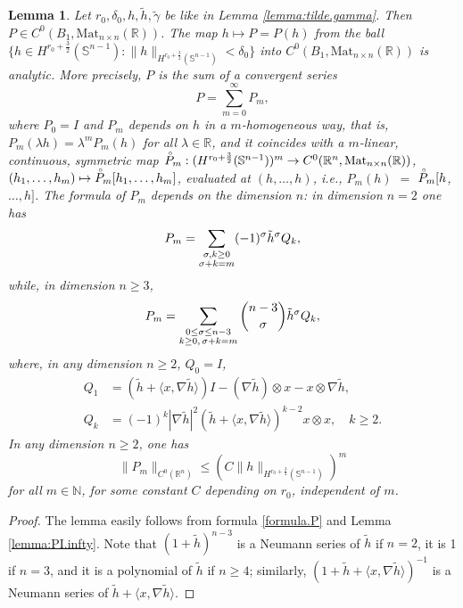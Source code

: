 \documentclass[10pt,reqno,a4paper]{article}
\numberwithin{equation}{section}
\theoremstyle{plain}
\newtheorem{lemma}[theorem]{Lemma}
\theoremstyle{definition}
\newcommand{\N}{{\mathbb N}}
\newcommand{\R}{{\mathbb R}}
\renewcommand{\S}{{\mathbb S}}
\newcommand{\lm}{\lambda}
\newcommand{\la}{\langle}
\newcommand{\ra}{\rangle}
\newcommand{\grad}{\nabla}
\begin{document}
\begin{lemma} \label{lemma:P}
Let $r_0, \delta_0, h, \tilde h, \tilde \gamma$ be like in Lemma \ref{lemma:tilde.gamma}. 
Then $P \in C^0(B_1, \mathrm{Mat}_{n \times n}(\R))$.
The map $h \mapsto P = P(h)$ from the ball 
$\{ h \in H^{r_0+\frac32}(\S^{n-1}) : \| h \|_{H^{r_0+\frac32}(\S^{n-1})} < \delta_0 \}$ 
into $C^0(B_1, \mathrm{Mat}_{n \times n}(\R))$ is analytic.  
More precisely, $P$ is the sum of a convergent series 
\[
P = \sum_{m=0}^\infty P_m,
\]
where $P_0 = I$ and $P_m$ depends on $h$ in a $m$-homogeneous way, 
that is, $P_m(\lm h) = \lm^m P_m(h)$ for all $\lm \in \R$, 
and it coincides with a $m$-linear, continuous, symmetric map  
$\accentset{\circ}{P}_m : ( H^{r_0+\frac32}(\S^{n-1}) )^m \to C^0(\R^n, \mathrm{Mat}_{n \times n}(\R))$, 
$(h_1, \ldots, h_m) \mapsto \accentset{\circ}{P}_m [h_1, \ldots, h_m]$,
evaluated at $(h, \ldots, h)$, i.e., $P_m(h)$ $=$ $\accentset{\circ}{P}_m [h$, $\ldots, h ]$. 
The formula of $P_m$ depends on the dimension $n$: 
in dimension $n=2$ one has 
\[
P_m = \sum_{\begin{subarray}{c} \sigma, k \geq 0 \\ \sigma + k = m \end{subarray}} 
(-1)^\sigma \tilde h^\sigma Q_k,
\]
while, in dimension $n \geq 3$, 
\[
P_m = \sum_{\begin{subarray}{c} 0 \leq \sigma \leq n-3 \\ k \geq 0, \,  \sigma + k = m \end{subarray}} 
\binom{n-3}{\sigma} \tilde h^\sigma Q_k,
\]
where, in any dimension $n \geq 2$, $Q_0 = I$, 
\begin{align*}
Q_1 & = (\tilde h + \la x, \grad \tilde h \ra) I - (\grad \tilde h) \otimes x - x \otimes \grad \tilde h,
\\
Q_k & = (-1)^k |\grad \tilde h|^2 (\tilde h + \la x, \grad \tilde h \ra)^{k-2} x \otimes x, 
\quad k \geq 2.
\end{align*}
In any dimension $n \geq 2$, one has 
\begin{equation} \label{est.P.m.C.0} 
\| P_m \|_{C^0(\R^n)} \leq (C \| h \|_{H^{r_0+\frac32}(\S^{n-1})} )^m
\end{equation}
for all $m \in \N$, for some constant $C$ depending on $r_0$, independent of $m$. 
\end{lemma}

\begin{proof} 
The lemma easily follows from formula \eqref{formula.P} and Lemma \ref{lemma:PI.infty}.
Note that $(1 + \tilde h)^{n-3}$ is a Neumann series of $\tilde h$ if $n=2$, 
it is 1 if $n=3$, and it is a polynomial of $\tilde h$ if $n \geq 4$; 
similarly, $(1 + \tilde h + \la x, \grad \tilde h \ra)^{-1}$ is a Neumann series 
of $\tilde h + \la x, \grad \tilde h \ra$. 
\end{proof}
\end{document}

